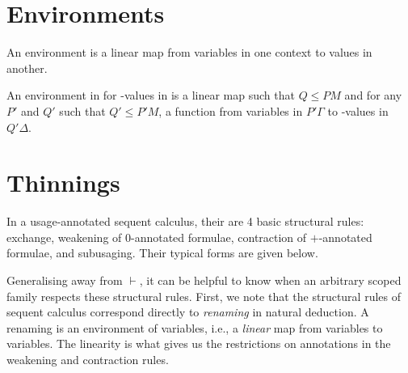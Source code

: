 \section{Environments}

An environment is a linear map from variables in one context to values in
another.


An environment in  for -values in
 is a linear map  such that $Q \le PM$ and for any
$P'$ and $Q'$ such that $Q' \le P'M$, a function from variables in $P'Γ$ to
-values in $Q'Δ$.

\section{Thinnings}


In a usage-annotated sequent calculus, their are 4 basic structural rules:
exchange, weakening of $0$-annotated formulae, contraction of $+$-annotated
formulae, and subusaging.
Their typical forms are given below.


Generalising away from $\vdash$, it can be helpful to know when an arbitrary
scoped family respects these structural rules.
First, we note that the structural rules of sequent calculus correspond
directly to \emph{renaming} in natural deduction.
A renaming is an environment of variables, i.e., a \emph{linear} map from
variables to variables.
The linearity is what gives us the restrictions on annotations in the weakening
and contraction rules.


